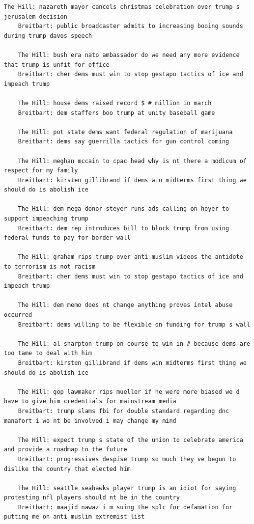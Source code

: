 \documentclass{scrartcl}
\begin{document}
\begin{lstlisting}[basicstyle=\tiny\hlfont]
    The Hill: nazareth mayor cancels christmas celebration over trump s jerusalem decision
    Breitbart: public broadcaster admits to increasing booing sounds during trump davos speech

    The Hill: bush era nato ambassador do we need any more evidence that trump is unfit for office
    Breitbart: cher dems must win to stop gestapo tactics of ice and impeach trump

    The Hill: house dems raised record $ # million in march
    Breitbart: dem staffers boo trump at unity baseball game

    The Hill: pot state dems want federal regulation of marijuana
    Breitbart: dems say guerrilla tactics for gun control coming

    The Hill: meghan mccain to cpac head why is nt there a modicum of respect for my family
    Breitbart: kirsten gillibrand if dems win midterms first thing we should do is abolish ice

    The Hill: dem mega donor steyer runs ads calling on hoyer to support impeaching trump
    Breitbart: dem rep introduces bill to block trump from using federal funds to pay for border wall

    The Hill: graham rips trump over anti muslim videos the antidote to terrorism is not racism
    Breitbart: cher dems must win to stop gestapo tactics of ice and impeach trump

    The Hill: dem memo does nt change anything proves intel abuse occurred
    Breitbart: dems willing to be flexible on funding for trump s wall

    The Hill: al sharpton trump on course to win in # because dems are too tame to deal with him
    Breitbart: kirsten gillibrand if dems win midterms first thing we should do is abolish ice

    The Hill: gop lawmaker rips mueller if he were more biased we d have to give him credentials for mainstream media
    Breitbart: trump slams fbi for double standard regarding dnc manafort i wo nt be involved i may change my mind

    The Hill: expect trump s state of the union to celebrate america and provide a roadmap to the future
    Breitbart: progressives despise trump so much they ve begun to dislike the country that elected him

    The Hill: seattle seahawks player trump is an idiot for saying protesting nfl players should nt be in the country
    Breitbart: maajid nawaz i m suing the splc for defamation for putting me on anti muslim extremist list


\end{lstlisting}
\end{document}
